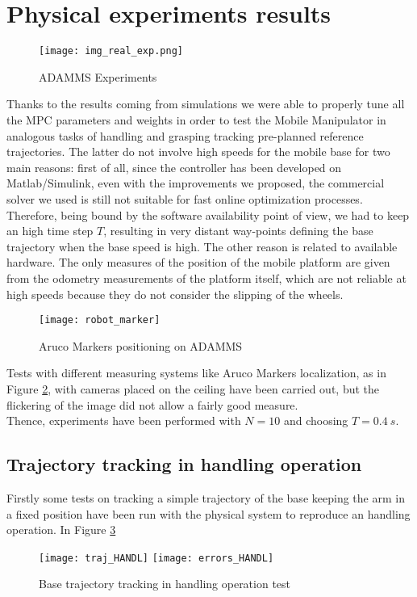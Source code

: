 \section{Physical experiments results}
\begin{figure}[h!]
	\centering
	\texttt{[image: img\_real\_exp.png]}
	\caption{ADAMMS Experiments}
	\label{img_real_exp}
\end{figure}
Thanks to the results coming from simulations we were able to properly tune all the MPC parameters and weights in order to test the Mobile Manipulator in analogous tasks of handling and grasping tracking pre-planned reference trajectories. The latter do not involve high speeds for the mobile base for two main reasons: first of all, since the controller has been developed on Matlab/Simulink, even with the improvements we proposed, the commercial solver we used is still not suitable for fast online optimization processes. Therefore, being bound by the software availability point of view, we had to keep an high time step $T$, resulting in very distant way-points defining the base trajectory when the base speed is high. The other reason is related to available hardware.
The only measures of the position of the mobile platform are given from the odometry measurements of the platform itself, which are not reliable at high speeds because they do not consider the slipping of the wheels. 
\begin{figure}[h!]
	\centering
	\texttt{[image: robot\_marker]}
	\caption{Aruco Markers positioning on ADAMMS}
	\label{robot_marker}
\end{figure} Tests with different measuring systems like Aruco Markers localization, as in Figure \ref{robot_marker}, with cameras placed on the ceiling have been carried out, but the flickering of the image did not allow a fairly good measure.\\
Thence, experiments have been performed with $N=10$ and choosing $T=0.4\ s$.

\subsection{Trajectory tracking in handling operation}
Firstly some tests on tracking a simple trajectory of the base keeping the arm in a fixed position have been run with the physical system to reproduce an handling operation. In Figure \ref{traj_handl} 
\begin{figure}%
	\centering
	\texttt{[image: traj\_HANDL]}
	\texttt{[image: errors\_HANDL]}
	\caption{Base trajectory tracking in handling operation test}
	\label{traj_handl}
\end{figure}

